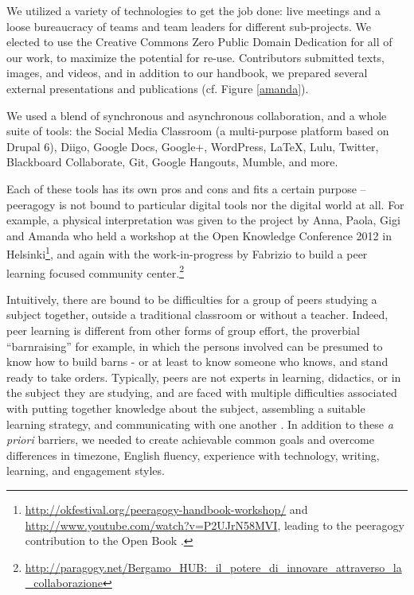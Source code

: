 \documentclass{acm_proc_article-sp}
\begin{document}
We utilized a variety of technologies to get the job done: live
meetings and a loose bureaucracy of teams and team leaders for
different sub-projects.  We elected to use the Creative Commons Zero
Public Domain Dedication for all of our work, to maximize the
potential for re-use.  Contributors submitted texts, images, and
videos, and in addition to our handbook, we prepared several external
presentations and publications (cf. Figure \ref{amanda}).

We used a blend of synchronous and asynchronous collaboration, and a
whole suite of tools: the Social Media Classroom (a multi-purpose platform based on Drupal 6), Diigo, Google Docs, Google+, WordPress, LaTeX, Lulu, Twitter, Blackboard Collaborate, Git, Google Hangouts, Mumble, and more.

Each of these tools has its own pros and cons and fits a certain
purpose -- peeragogy is not bound to particular digital tools nor the
digital world at all.  For example, a physical interpretation was
given to the project by Anna, Paola, Gigi and Amanda who held a
workshop at the Open Knowledge Conference 2012 in Helsinki\footnote{
  \url{http://okfestival.org/peeragogy-handbook-workshop/} and
  \url{http://www.youtube.com/watch?v=P2UJrN58MVI}, leading to the
  peeragogy contribution to the Open Book \cite{PeeragogyinAction}.},
and again with the work-in-progress by Fabrizio to build a peer learning focused community center.\footnote{\url{http://paragogy.net/Bergamo_HUB:_il_potere_di_innovare_attraverso_la_collaborazione}}

Intuitively, there are bound to be difficulties for a group of peers studying a subject together, outside a traditional classroom or without a teacher. Indeed, peer learning is different from other forms of group effort, the proverbial ``barnraising'' for example, in which the persons involved can be presumed to know how to build barns - or at least to know someone who knows, and stand ready to take orders.  Typically, peers are not experts in learning, didactics, or in the subject they are studying, and are faced with multiple difficulties associated with putting together knowledge about the subject, assembling a suitable learning strategy, and communicating with one another \cite{paragogy}.  In addition to these \emph{a priori} barriers, we needed to create achievable common goals and overcome differences in timezone, English fluency, experience with technology, writing, learning, and engagement styles.
\end{document}
